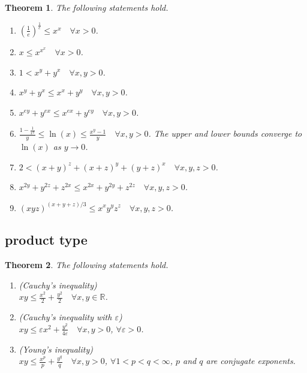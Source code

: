 \documentclass[11pt,a4paper]{report}
\newtheorem{theorem}{Theorem}[section]
\theoremstyle{definition}
\begin{document}
\begin{theorem}
	The following statements hold.
	\begin{enumerate}[label=(\alph*)] 
		\rm\item $\displaystyle \left(\frac{1}{e}\right)^{\frac{1}{e}} \leq x^{x} \quad \forall x > 0$.
		\rm\item $\displaystyle x \leq x^{x^{x}} \quad \forall x > 0$.
		\rm\item $1 < x^{y}+y^{x}  \quad \forall x, y > 0$.
		\rm\item $x^{y}+y^{x} \leq x^{x}+y^{y} \quad \forall x, y > 0$.
		\rm\item $x^{e y}+y^{e x} \leq x^{e x}+y^{e y} \quad \forall x, y > 0$.
		\rm\item $\displaystyle \frac{1-\frac{1}{x^{y}}}{y} \leq \ln (x) \leq \frac{x^{y} - 1}{y} \quad \forall x, y > 0$. The upper and lower bounds converge to $\ln (x)$ as $y \rightarrow 0$.
		\rm\item $2 < (x+y)^{z}+(x+z)^{y}+(y+z)^{x} \quad \forall x, y, z > 0$.
		\rm\item $x^{2 y}+y^{2 z}+z^{2 x} \leq x^{2 x}+y^{2 y}+z^{2 z} \quad \forall x, y, z > 0$.
		\rm\item $(x y z)^{(x+y+z) / 3} \leq x^{x} y^{y} z^{z} \quad \forall x, y, z > 0$.
	\end{enumerate}
	
\end{theorem}

\subsection{product type}

\begin{theorem}
	The following statements hold.
	\begin{enumerate}[label=(\alph*)] 
		\rm\item (Cauchy's inequality) \\[0.1cm]
		$\displaystyle xy \leq \frac{x^{2}}{2}+\frac{y^{2}}{2} \quad \forall x, y \in \mathbb{R}$. 
		\rm\item (Cauchy's inequality with $\varepsilon$)\\[0.1cm]
		$\displaystyle xy \leq \varepsilon x^{2}+\frac{y^{2}}{4 \varepsilon} \quad \forall x, y>0$, $\forall \varepsilon>0$.
		\rm\item (Young's inequality)\\[0.1cm]
		$\displaystyle xy \leq \frac{x^p}{p} + \frac{y^q}{q} \quad \forall x, y>0$, $\forall 1 < p < q < \infty$, $p$ and $q$ are conjugate exponents.
	\end{enumerate}
\end{theorem}
\end{document}
